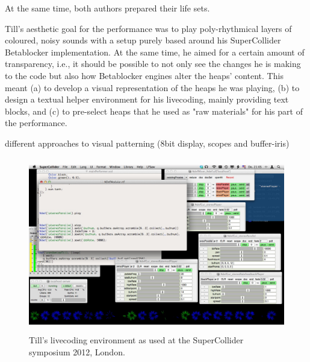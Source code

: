 \documentclass[letterpaper, 12pt]{article}
\begin{document}
At the same time, both authors prepared their life sets.

Till's aesthetic goal for the performance was to play poly-rhythmical layers of coloured, noisy sounds with a setup purely based around his SuperCollider Betablocker implementation. 
At the same time, he aimed for a certain amount of transparency, i.e., it should be possible to not only see the changes he is making to the code but also how  Betablocker engines alter the heaps' content.
This meant 
(a) to develop a visual representation of the heaps he was playing, 
(b) to design a textual helper environment for his livecoding, mainly providing text blocks, and
(c) to pre-select heaps that he used as "raw materials" for his part of the  performance.

different approaches to visual patterning (8bit display, scopes and buffer-iris)


\begin{figure}
	\centering
		\includegraphics[height=3in]{2012-SuperColliderSymposiumLiveCodingEnvironment-till}
	\caption{Till's livecoding environment as used at the SuperCollider symposium 2012, London.}
	\label{fig:fig_2012-SuperColliderSymposiumLiveCodingEnvironment-till}
\end{figure}
\end{document}
